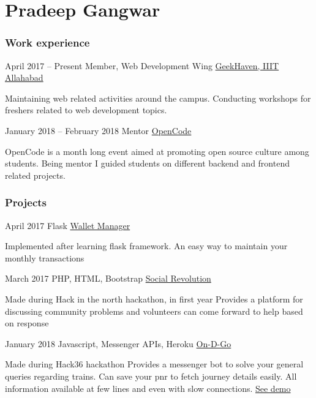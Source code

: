 \documentclass{tccv}
\begin{document}
\part{Pradeep Gangwar}

\section{Work experience}

\begin{eventlist}

\item{April 2017 -- Present}
     {Member, Web Development Wing}
     {\href{https://geekhaven.iiita.ac.in}{GeekHaven, IIIT Allahabad}}

Maintaining web related activities around the campus. Conducting workshops for freshers related to web development topics.

\item{January 2018 -- February 2018}
     {Mentor}
     {\href{http://github.com/opencode18/}{OpenCode}}

OpenCode is a month long event aimed at promoting open source culture among students. Being mentor I guided students on different backend and frontend related projects.

\end{eventlist}

\section{Projects}

\begin{eventlist}

\item{April 2017}
	{Flask}
    {\href{https://github.com/pradeepgangwar/Wallet-Manager}{Wallet Manager}}

Implemented after learning flask framework.\newline
An easy way to maintain your monthly transactions

\item{March 2017}
     {PHP, HTML, Bootstrap}
     {\href{https://github.com/pradeepgangwar/SocialRevolution}{Social Revolution}}
     
Made during Hack in the north hackathon, in first year\newline
Provides a platform for discussing community problems and volunteers can come forward to help based on response

\item{January 2018}
     {Javascript, Messenger APIs, Heroku}
     {\href{https://github.com/pradeepgangwar/On-D-Go}{On-D-Go}}
     
Made during Hack36 hackathon\newline
Provides a messenger bot to solve your general queries regarding trains. Can save your pnr to fetch journey details easily. All information available at few lines and even with slow connections. {\href{https://facebook.com/OnDGoBot}{See demo}}

\end{eventlist}
\end{document}
